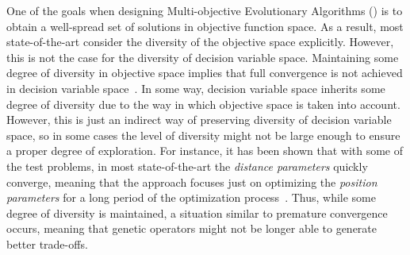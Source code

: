 One of the goals when designing Multi-objective Evolutionary Algorithms (\MOEAS{}) is to obtain a well-spread 
set of solutions in objective function space.
%
As a result, most state-of-the-art \MOEAS{} consider the diversity of the objective space explicitly.
%
However, this is not the case for the diversity of decision variable space.
%
Maintaining some degree of diversity in objective space implies that full convergence 
is not achieved in decision variable space~\citep{Joel:GDE3_CEC09}.
%
In some way, decision variable space inherits some degree of diversity due to the way in which objective space is 
taken into account. 
%
However, this is just an indirect way of preserving diversity of decision variable space, so 
in some cases the level of diversity might not be large enough to ensure a proper degree of exploration.
%
For instance, it has been shown that with some of the \WFG{} test problems, in most state-of-the-art \MOEAS{} 
the \textit{distance parameters} quickly converge, meaning that the approach focuses just on optimizing the 
\textit{position parameters} for a long period of the optimization process~\citep{Joel:GDE3_CEC09}.
%
Thus, while some degree of diversity is maintained, a situation similar to premature convergence occurs,
meaning that genetic operators might not be longer able to generate better trade-offs. 

